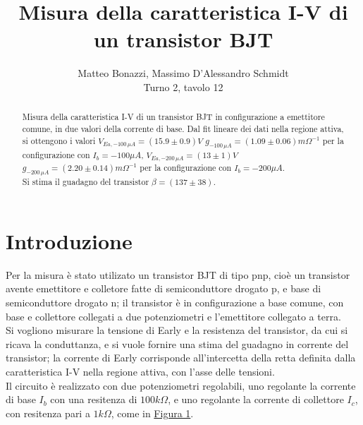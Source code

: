 \documentclass{article}
\title{Misura della caratteristica I-V di un transistor BJT}
\author{Matteo Bonazzi, Massimo D'Alessandro Schmidt\\ Turno 2, tavolo 12}
\begin{document}
\maketitle
\begin{abstract}
    Misura della caratteristica I-V di un transistor BJT in configurazione a emettitore comune, in due valori della corrente di base.\newline
    Dal fit lineare dei dati nella regione attiva, si ottengono i valori $V_{Ea,-100 \,\mu A}=(15.9\pm 0.9) V$ $g_{-100 \,\mu A}=(1.09 \pm 0.06) m\Omega^{-1} $ per la configurazione con $I_b=-100 \mu A$, $V_{Ea,-200 \,\mu A}=(13\pm 1) V $ $g_{-200 \,\mu A}=(2.20 \pm 0.14) m\Omega^{-1}$ per la configurazione con $I_b=-200 \mu A$.\\
    Si stima il guadagno del transistor $\beta=(137\pm38)$.\\
\end{abstract}
\tableofcontents
\section{Introduzione}
Per la misura è stato utilizato un transistor BJT di tipo pnp, cioè un transistor avente emettitore e colletore fatte di semiconduttore drogato p, e base di semiconduttore drogato n; il transistor è in configurazione a base comune, con base
e collettore collegati a due potenziometri e l'emettitore collegato a terra.\\
Si vogliono misurare la tensione di Early e la resistenza del transistor, da cui si ricava la conduttanza, e si vuole fornire una stima del guadagno in corrente del transistor;
la corrente di Early corrisponde all'intercetta della retta definita dalla caratteristica I-V nella regione attiva, con l'asse delle tensioni.\\
Il circuito è realizzato con due potenziometri regolabili, uno regolante la corrente di base $I_b$ con una resitenza di $100k\Omega$, e uno regolante
la corrente di collettore $I_c$, con resitenza pari a $1k\Omega$, come in \hyperref[fig:circuito]{Figura 1}.\par
\end{document}
